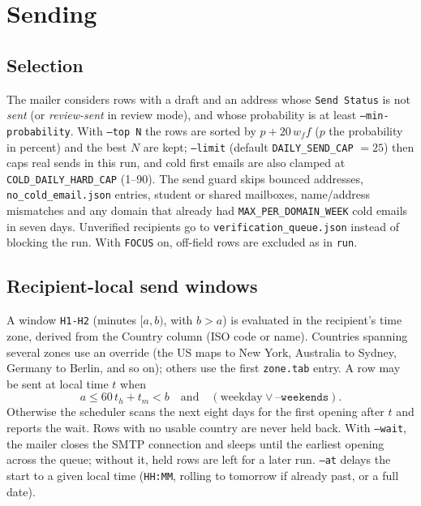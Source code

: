 \documentclass[11pt,a4paper]{article}
\newcommand{\code}[1]{\texttt{#1}}
\begin{document}
\section{Sending}

\subsection{Selection}
The mailer considers rows with a draft and an address whose \code{Send Status} is not
\emph{sent} (or \emph{review-sent} in review mode), and whose probability is at least
\code{--min-probability}. With \code{--top N} the rows are sorted by
$p + 20\,w_f f$ ($p$ the probability in percent) and the best $N$
are kept; \code{--limit} (default \code{DAILY\_SEND\_CAP} $= 25$) then caps real sends in this
run, and cold first emails are also clamped at \code{COLD\_DAILY\_HARD\_CAP} (1--90). The send guard
skips bounced addresses, \code{no\_cold\_email.json} entries, student or shared mailboxes,
name/address mismatches and any domain that already had \code{MAX\_PER\_DOMAIN\_WEEK} cold emails
in seven days. Unverified recipients go to \code{verification\_queue.json} instead of blocking
the run. With \code{FOCUS} on, off-field rows are excluded as in \code{run}.

\subsection{Recipient-local send windows}
A window \code{H1-H2} (minutes $[a, b)$, with $b > a$) is evaluated in the recipient's time
zone, derived from the Country column (ISO code or name). Countries spanning several zones use
an override (the US maps to New York, Australia to Sydney, Germany to Berlin, and so on);
others use the first \code{zone.tab} entry. A row may be sent at local time $t$ when
\[
  a \le 60\,t_h + t_m < b \quad\text{and}\quad (\text{weekday} \lor \texttt{--weekends}) .
\]
Otherwise the scheduler scans the next eight days for the first opening after $t$ and reports the
wait. Rows with no usable country are never held back. With \code{--wait}, the mailer closes the
SMTP connection and sleeps until the earliest opening across the queue; without it, held rows are
left for a later run. \code{--at} delays the start to a given local time (\code{HH:MM}, rolling to
tomorrow if already past, or a full date).
\end{document}
